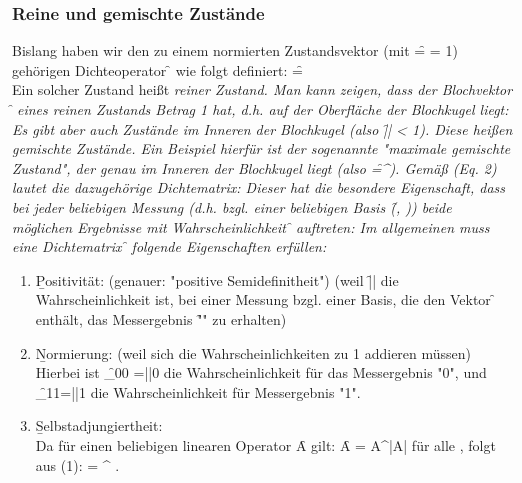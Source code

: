 \subsubsection*{Reine und gemischte Zustände}
Bislang haben wir den zu einem normierten Zustandsvektor \ket{\psi} (mit \f{\left\Vert\cket{\psi}\right\Vert = \sqrt{\skal{\psi}{\psi}} = 1}) gehörigen Dichteoperator \f{\varrho} wie folgt definiert: \f{\quad\varrho=\cket{\psi}\cbra{\psi}}\\
Ein solcher Zustand heißt \it{reiner Zustand}. Man kann zeigen, dass der Blochvektor \f{} eines reinen Zustands Betrag 1 hat, d.h. auf der Oberfläche der Blochkugel liegt:
Es gibt aber auch Zustände im Inneren der Blochkugel (also \f{|| < 1}). Diese heißen \it{gemischte Zustände}. Ein Beispiel hierfür ist der sogenannte "maximale gemischte Zustand", der genau im Inneren der Blochkugel liegt (also \f{=^\top }). Gemäß (Eq. 2) lautet die dazugehörige Dichtematrix:
Dieser hat die besondere Eigenschaft, dass bei jeder beliebigen Messung (d.h. bzgl. einer beliebigen Basis \f{(, )}) beide möglichen Ergebnisse mit Wahrscheinlichkeit \f{} auftreten:
Im allgemeinen muss eine Dichtematrix \f{\varrho} folgende Eigenschaften erfüllen:
\begin{enumerate}
    \item \b{Positivität:} (genauer: "positive Semidefinitheit")
    (weil \f{\left\langle \psi|\varrho|\psi\right\rangle} die Wahrscheinlichkeit ist, bei einer Messung bzgl. einer Basis, die den Vektor \f{\cket{\psi}} enthält, das Messergebnis "\f{\cket{\psi}}" zu erhalten)
    \item \b{Normierung:} (weil sich die Wahrscheinlichkeiten zu 1 addieren müssen)
    Hierbei ist \f{\varrho_{00} =|\varrho|0\rangle} die Wahrscheinlichkeit für das Messergebnis "0", und \f{\varrho_{11}=|\varrho|1\rangle} die Wahrscheinlichkeit für Messergebnis "1".
    \item \b{Selbstadjungiertheit:}\\
    Da für einen beliebigen linearen Operator \f{A} gilt: \f{A = A^\dagger \Leftrightarrow \langle\psi|A|\psi\rangle\in{}} für alle \ket{\psi}, folgt aus (1): \f{
        \varrho = \varrho^\dagger
    }.
\end{enumerate}
